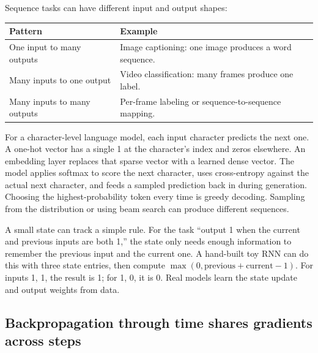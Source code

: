 Sequence tasks can have different input and output shapes:

{\def\LTcaptype{none} %
\begin{longtable}[]{@{}
  >{\raggedright\arraybackslash}p{}
  >{\raggedright\arraybackslash}p{}@{}}
\toprule\noalign{}
\begin{minipage}[b]{\linewidth}\raggedright
Pattern
\end{minipage} & \begin{minipage}[b]{\linewidth}\raggedright
Example
\end{minipage} \\
\midrule\noalign{}
\endhead
\bottomrule\noalign{}
\endlastfoot
One input to many outputs & Image captioning: one image produces a word sequence. \\
Many inputs to one output & Video classification: many frames produce one label. \\
Many inputs to many outputs & Per-frame labeling or sequence-to-sequence mapping. \\
\end{longtable}
}

For a character-level language model, each input character predicts the next one. A one-hot vector has a single 1 at the character's index and zeros elsewhere. An embedding layer replaces that sparse vector with a learned dense vector. The model applies softmax to score the next character, uses cross-entropy against the actual next character, and feeds a sampled prediction back in during generation. Choosing the highest-probability token every time is greedy decoding. Sampling from the distribution or using beam search can produce different sequences.

A small state can track a simple rule. For the task ``output 1 when the current and previous inputs are both 1,'' the state only needs enough information to remember the previous input and the current one. A hand-built toy RNN can do this with three state entries, then compute \(\max(0,\text{previous}+\text{current}-1)\). For inputs 1, 1, the result is 1; for 1, 0, it is 0. Real models learn the state update and output weights from data.

\subsection{Backpropagation through time shares gradients across steps}\label{04-visual-computing-ii-ch031-backpropagation-through-time-shares-gradients-across-steps}

